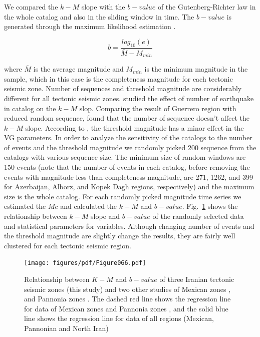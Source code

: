 \noindent
We compared the $k-M$ slope with the $b-value$ of the Gutenberg-Richter law in the whole catalog and also in the sliding window in time. The $b-value$ is generated through the maximum likelihood estimation \citep{Aki1965}.

\begin{equation}
b = \frac{log_{10}(e) }{\overline{M} - M_{min}}  
\end{equation}
 
 \noindent
 where $\overline{M}$ is the average magnitude and $M_{min}$ is the minimum magnitude in the sample, which in this case is the completeness magnitude for each tectonic seismic zone. Number of sequences and threshold magnitude are considerably different for all tectonic seismic zones. \citet{Telesca2013} studied the effect of number of earthquake in catalog on the $k-M$ slop. Comparing the result of Guerrero region with reduced random sequence, \citet{Telesca2013} found that the number of sequence doesn't affect the $k-M$ slope.  According to \citet{Telesca2012}, the threshold magnitude has a minor effect in the VG parameters. In order to analyze the sensitivity of the catalogs to the number of events and the threshold magnitude we randomly picked 200 sequence from the catalogs with various sequence size. The minimum size of random windows are 150 events (note that the number of events in each catalog, before removing the events with magnitude less than completeness magnitude, are 271, 1262, and 399 for Azerbaijan, Alborz, and Kopek Dagh regions, respectively) and the maximum size is the whole catalog. For each randomly picked magnitude time series we estimated the $Mc$ and calculated the $k-M$ and $b-value$. Fig.~\ref{fig:random} shows the relationship between $k-M$ slope and $b-value$ of the randomly selected data and statistical parameters for variables. Although changing number of events and the threshold magnitude are slightly change the results, they are fairly well clustered for each tectonic seismic region. 
 
 \begin{figure} [ht]
\centering
\texttt{[image: figures/pdf/Figure066.pdf]} 
\caption{ Relationship between $K-M$ and $b-value$ of three Iranian tectonic seismic zones (this study) and two other studies of Mexican zones \citep{Telesca2013}, and Pannonia zones \citep{Telesca2014}. The dashed red line shows the regression line for data of  Mexican zones and Pannonia zones \citep{Telesca2014}, and the solid blue line shows the regression line for data of all regions (Mexican, Pannonian and North Iran)}
\label{fig:random}
\end{figure}
 
